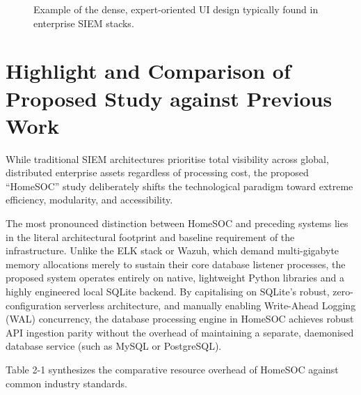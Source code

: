 \begin{figure}[h]
    \centering
    \caption{Example of the dense, expert-oriented UI design typically found in enterprise SIEM stacks.}
    \label{fig:siem_ui}
\end{figure}

\section{Highlight and Comparison of Proposed Study against Previous Work}
While traditional SIEM architectures prioritise total visibility across global, distributed enterprise assets regardless of processing cost, the proposed ``HomeSOC'' study deliberately shifts the technological paradigm toward extreme efficiency, modularity, and accessibility. 

The most pronounced distinction between HomeSOC and preceding systems lies in the literal architectural footprint and baseline requirement of the infrastructure. Unlike the ELK stack or Wazuh, which demand multi-gigabyte memory allocations merely to sustain their core database listener processes, the proposed system operates entirely on native, lightweight Python libraries and a highly engineered local SQLite backend. By capitalising on SQLite's robust, zero-configuration serverless architecture, and manually enabling Write-Ahead Logging (WAL) concurrency, the database processing engine in HomeSOC achieves robust API ingestion parity without the overhead of maintaining a separate, daemonised database service (such as MySQL or PostgreSQL).

Table 2-1 synthesizes the comparative resource overhead of HomeSOC against common industry standards.


